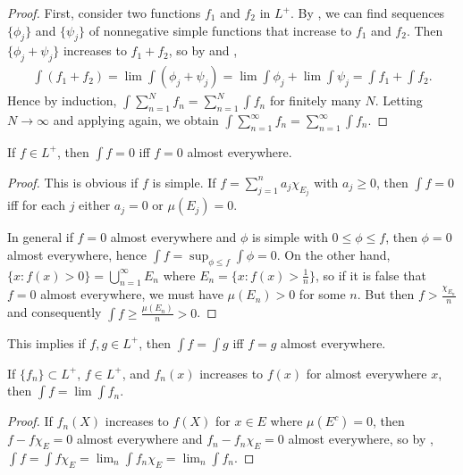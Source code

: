 \begin{proof}
    First, consider two functions $f_1$ and $f_2$ in $L^+$.
    By , we can find sequences $\{ \phi_j \}$ and $\{ \psi_j \}$ of nonnegative simple functions that increase to $f_1$ and $f_2$.
    Then $\{ \phi_j + \psi_j \}$ increases to $f_1 + f_2$, so by  and , 
    \begin{align}
        \int (f_1 + f_2) = \lim \int (\phi_j + \psi_j) = \lim \int \phi_j + \lim \int \psi_j = \int f_1 + \int f_2.
    \end{align}
    Hence by induction, $\int \sum_{n=1}^{N} f_n = \sum_{n=1}^{N} \int f_n$ for finitely many $N$.
    Letting $N \to \infty$ and applying  again, we obtain $\int \sum_{n=1}^{\infty} f_n = \sum_{n=1}^{\infty} \int f_n$.
\end{proof}

\begin{proposition}
    If $f \in L^+$, then $\int f = 0$ iff $f = 0$ almost everywhere.
\end{proposition}

\begin{proof}
    This is obvious if $f$ is simple.
    If $f = \sum_{j=1}^{n} a_j \chi_{E_j}$ with $a_j \ge 0$, then $\int f = 0$ iff for each $j$ either $a_j = 0$ or $\mu(E_j) = 0$.
    
    In general if $f=0$ almost everywhere and $\phi$ is simple with $0 \le \phi \le f$, then $\phi = 0$ almost everywhere, hence $\int f = \sup_{\phi \le f} \int \phi = 0$.
    On the other hand, $\{ x: f(x) > 0 \} = \bigcup_{n=1}^{\infty} E_n$ where $E_n = \{ x: f(x) > \frac{1}{n} \}$, so if it is false that $f=0$ almost everywhere, we must have $\mu(E_n) > 0$ for some $n$.
    But then $f > \frac{\chi_{E_n}}{n}$ and consequently $\int f \ge \frac{\mu(E_n)}{n} > 0$. 
\end{proof}

This implies if $f, g \in L^+$, then $\int f = \int g$ iff $f = g$ almost everywhere.

\begin{corollary}
    If $\{ f_n \} \subset L^+$, $f \in L^+$, and $f_n(x)$ increases to $f(x)$ for almost everywhere $x$, then $\int f = \lim \int f_n$.
\end{corollary}

\begin{proof}
    If $f_n(X)$ increases to $f(X)$ for $x \in E$ where $\mu(E^c) = 0$, then $f - f \chi_{E} = 0$ almost everywhere and $f_n - f_n \chi_{E} = 0$ almost everywhere, so by , $\int f = \int f \chi_E = \lim_n \int f_n \chi_E = \lim_n \int f_n$.
\end{proof}

